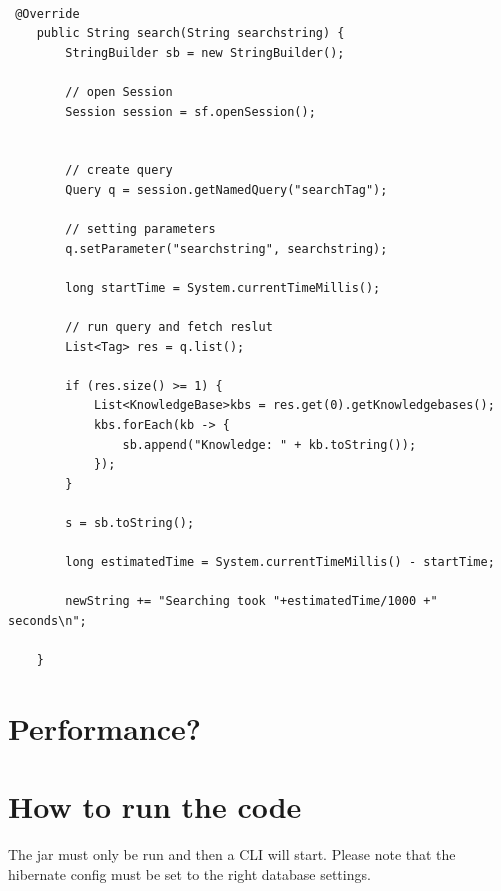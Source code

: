 \documentclass[12pt]{article}
\begin{document}
\begin{lstlisting}[caption=Search method of the Service, label=generateEntry]

 @Override
    public String search(String searchstring) {
        StringBuilder sb = new StringBuilder();

        // open Session
        Session session = sf.openSession();


        // create query
        Query q = session.getNamedQuery("searchTag");

        // setting parameters
        q.setParameter("searchstring", searchstring);

        long startTime = System.currentTimeMillis();

        // run query and fetch reslut
        List<Tag> res = q.list();

        if (res.size() >= 1) {
            List<KnowledgeBase>kbs = res.get(0).getKnowledgebases();
            kbs.forEach(kb -> {
                sb.append("Knowledge: " + kb.toString());
            });
        }
        
        s = sb.toString();

        long estimatedTime = System.currentTimeMillis() - startTime;

        newString += "Searching took "+estimatedTime/1000 +" seconds\n";

    }
    \end{lstlisting}
\section{Performance?}

\section{How to run the code}
The jar must only be run and then a CLI will start. Please note that the hibernate config must be set to the right database settings.
\end{document}
